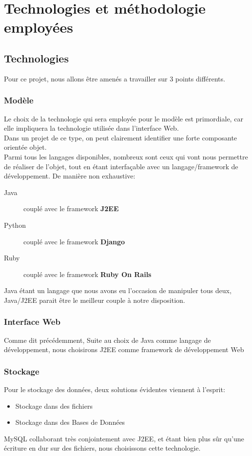\chapter{Technologies et méthodologie employées}
    \section{Technologies}
        Pour ce projet, nous allons être amenés a travailler sur 3 points différents.
            \subsection{Modèle}
                Le choix de la technologie qui sera employée pour le modèle est primordiale, car elle impliquera la technologie utilisée dans l'interface Web.\\
                Dans un projet de ce type, on peut clairement identifier une forte composante orientée objet.\\
                Parmi tous les langages disponibles, nombreux sont ceux qui vont nous permettre de réaliser de l'objet, tout en étant interfaçable avec un langage/framework de développement. De manière non exhaustive:
                \begin{description}
                    \item[Java] couplé avec le framework \textbf{J2EE}
                    \item[Python] couplé avec le framework \textbf{Django}
                    \item[Ruby] couplé avec le framework \textbf{Ruby On Rails}
                \end{description}
                Java étant un langage que nous avons eu l'occasion de manipuler tous deux, Java/J2EE parait être le meilleur couple à notre disposition.
            \subsection{Interface Web}
                Comme dit précédemment, Suite au choix de Java comme langage de développement, nous choisirons J2EE comme framework de développement Web
            \subsection{Stockage}
                Pour le stockage des données, deux solutions évidentes viennent à l'esprit:
                \begin{itemize}
                    \item Stockage dans des fichiers
                    \item Stockage dans des Bases de Données
                \end{itemize}
                MySQL collaborant très conjointement avec J2EE, et étant bien plus sûr qu'une écriture en dur sur des fichiers, nous choisissons cette technologie.
